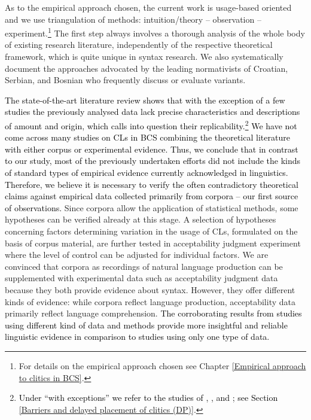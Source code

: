 As to the empirical approach chosen, the current work is usage-based oriented and we use triangulation of methods: intuition/theory – observation – experiment.\footnote{For details on the empirical approach chosen see Chapter \ref{Empirical approach to clitics in BCS}.} The first step always involves a thorough analysis of the whole body of existing research literature, independently of the respective theoretical framework, which is quite unique in syntax research. We also systematically document the approaches advocated by the leading normativists of Croatian, Serbian, and Bosnian who frequently discuss or evaluate variants.

\textcolor{black}{The state-of-the-art literature review shows that with the exception of a few studies the previously analysed data lack precise characteristics and descriptions of amount and origin, which calls into question their replicability.\footnote{\textcolor{black}{ Under ``with exceptions'' we refer to the studies of \citet{DFZ09}, \citet{ZFD17}, and \citet{DiesingZec17}; see Section \ref{Barriers and delayed placement of clitics (DP)}.}} We have not come across many studies on CLs in BCS combining the theoretical literature with either corpus or experimental evidence. Thus, we conclude that in contrast to our study, most of the previously undertaken efforts did not include the kinds of standard types of empirical evidence currently acknowledged in linguistics.
Therefore, we believe it is necessary to verify the often contradictory theoretical claims against empirical data collected primarily from corpora – our first source of observations.
} 
 Since corpora allow the application of statistical methods, some hypotheses can be verified already at this stage. A selection of hypotheses concerning factors determining variation in the usage of CLs, formulated on the basis of corpus material, are further tested in acceptability judgment experiment where the level of control can be adjusted for individual factors. We are convinced that corpora as recordings of natural language production can be supplemented with experimental data such as acceptability judgment data because they both provide evidence about syntax. However, they offer different kinds of evidence: while corpora reflect language production, acceptability data primarily reflect language comprehension. \textcolor{black}{The corroborating results from studies using different kind of data and methods provide more insightful and reliable linguistic evidence in comparison to studies using only one type of data.}

